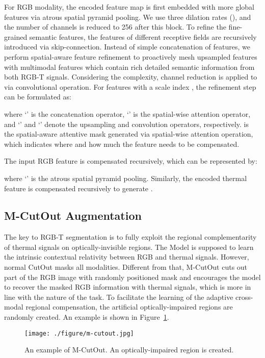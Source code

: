 \documentclass[letterpaper, 10 pt, conference]{ieeeconf}
\begin{document}
For RGB modality, the encoded feature map  is first embedded with more global features via atrous spatial pyramid pooling. We use three dilation rates (), and the number of channels is reduced to 256 after this block. To refine the fine-grained semantic features, the features of different receptive fields are recursively introduced via skip-connection. Instead of simple concatenation of features, we perform spatial-aware feature refinement to proactively mesh upsampled features with multimodal features  which contain rich detailed semantic information from both RGB-T signals. Considering the complexity, channel reduction is applied to  via convolutional operation. For features with a scale index , the refinement step can be formulated as:

where `' is the concatenation operator, `' is the spatial-wise attention operator, and `' and `' denote the upsampling and convolution operators, respectively.  is the spatial-aware attentive mask generated via spatial-wise attention operation, which indicates where and how much the feature needs to be compensated. 

The input RGB feature is compensated recursively, which can be represented by:

where `' is the atrous spatial pyramid pooling. Similarly, the encoded thermal feature is compensated recursively to generate .


\subsection{M-CutOut Augmentation}
The key to RGB-T segmentation is to fully exploit the regional complementarity of thermal signals on optically-invisible regions. The Model is supposed to learn the intrinsic contextual relativity between RGB and thermal signals. However, normal CutOut \cite{cutout} masks all modalities. Different from that, M-CutOut cuts out part of the RGB image with randomly positioned mask  and encourages the model to recover the masked RGB information with thermal signals, which is more in line with the nature of the task. To facilitate the learning of the adaptive cross-modal regional compensation, the artificial optically-impaired regions are randomly created. An example is shown in Figure~\ref{fig:m-cutout}.

\begin{figure}[ht]
  \centering
  \texttt{[image: ./figure/m-cutout.jpg]}
  \caption{An example of M-CutOut. An optically-impaired region is created.}
  \label{fig:m-cutout}
\end{figure}
\end{document}
